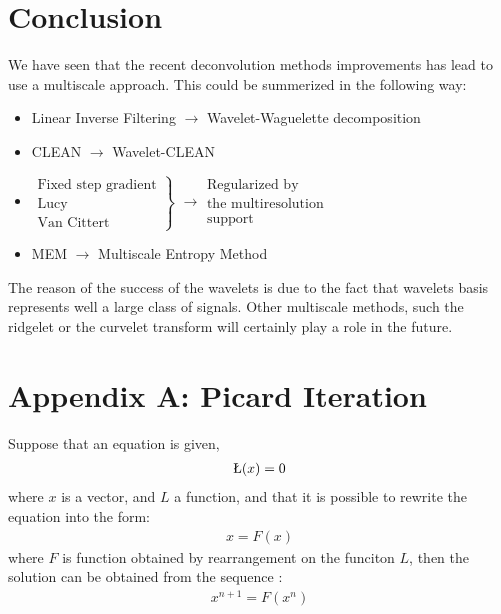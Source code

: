 \documentclass[11pt,a4paper]{article}
\newcommand{\be}{\begin{eqnarray}}
\newcommand{\ee}{\end{eqnarray}}
\begin{document}
\section{Conclusion}

We have seen that the recent deconvolution methods improvements
has lead to use a multiscale approach. This could be summerized in 
the following way:
\begin{itemize}
\item Linear Inverse Filtering $\rightarrow$  Wavelet-Waguelette decomposition\\
\item  CLEAN $\rightarrow$ Wavelet-CLEAN \\
\item \bigskip
\( \left. \begin{array}{l}
\mbox{Fixed step gradient}\\
\mbox{Lucy}\\
\mbox{Van Cittert}
\end{array}\right\} \) \( \rightarrow \begin{array}{c}
\mbox{Regularized by}\\
\mbox{the multiresolution}\\
\mbox{support}
\end{array} \) \\
\bigskip
\item MEM $\rightarrow$ Multiscale Entropy Method
\end{itemize}
The reason of the success of the wavelets is due to the fact that
wavelets basis represents well a large class of signals. Other multiscale
methods, such the ridgelet or the curvelet transform 
\cite{cur:candes99_1,cur:candes00,cur:donoho99,starck:sta01_3}
will certainly play a role in the future.

\newpage
% 

% 


\newpage
\section*{Appendix A: Picard Iteration}
\label{annex_picard}

Suppose that an equation is given, 
\be 
\L(x) = 0 
\ee
where $x$ is a vector, and $L$ a function, and that it is possible
to rewrite the equation into the form: 
\be
x = F(x)
\ee
where $F$ is function obtained by rearrangement on the funciton $L$,
then the solution can be obtained from the sequence 
\cite{ima:picard66,rest:hunt94}: 
\be
x^{n+1} = F(x^n) 
\ee
\end{document}
